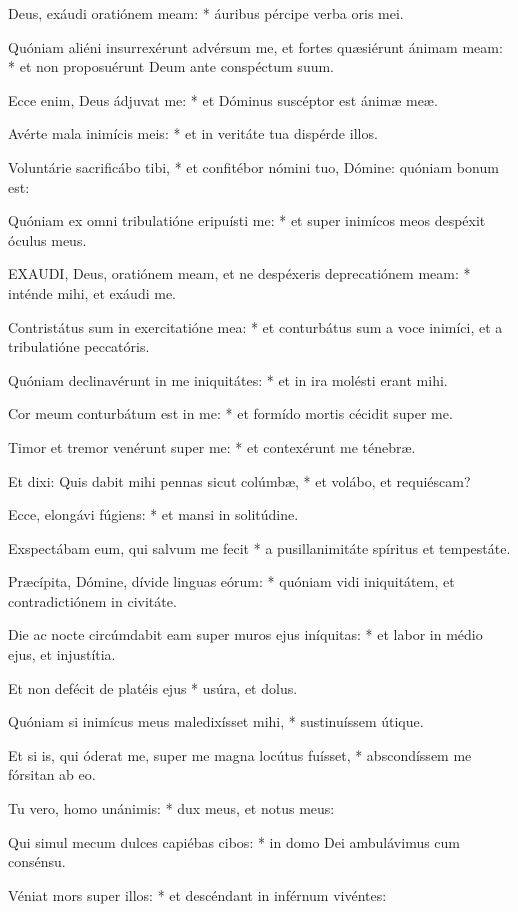 Deus, exáudi oratiónem meam: * áuribus pércipe verba oris mei.

Quóniam aliéni insurrexérunt advérsum me, et fortes quæsiérunt ánimam meam: * et non proposuérunt Deum ante conspéctum suum.

Ecce enim, Deus ádjuvat me: * et Dóminus suscéptor est ánimæ meæ.

Avérte mala inimícis meis: * et in veritáte tua dispérde illos.

Voluntárie sacrificábo tibi, * et confitébor nómini tuo, Dómine: quóniam bonum est:

Quóniam ex omni tribulatióne eripuísti me: * et super inimícos meos despéxit óculus meus.


\lettrine[lines=2]{E}{XAUDI}, Deus, oratiónem meam, et ne despéxeris deprecatiónem meam: * inténde mihi, et exáudi me.

Contristátus sum in exercitatióne mea: * et conturbátus sum a voce inimíci, et a tribulatióne peccatóris.

Quóniam declinavérunt in me iniquitátes: * et in ira molésti erant mihi.

Cor meum conturbátum est in me: * et formído mortis cécidit super me.

Timor et tremor venérunt super me: * et contexérunt me ténebræ.

Et dixi: Quis dabit mihi pennas sicut colúmbæ, * et volábo, et requiéscam?

Ecce, elongávi fúgiens: * et mansi in solitúdine.

Exspectábam eum, qui salvum me fecit * a pusillanimitáte spíritus et tempestáte.

Præcípita, Dómine, dívide linguas eórum: * quóniam vidi iniquitátem, et contradictiónem in civitáte.

Die ac nocte circúmdabit eam super muros ejus iníquitas: * et labor in médio ejus, et injustítia.

Et non defécit de platéis ejus * usúra, et dolus.

Quóniam si inimícus meus maledixísset mihi, * sustinuíssem útique.

Et si is, qui óderat me, super me magna locútus fuísset, * abscondíssem me fórsitan ab eo.

Tu vero, homo unánimis: * dux meus, et notus meus:

Qui simul mecum dulces capiébas cibos: * in domo Dei ambulávimus cum consénsu.

Véniat mors super illos: * et descéndant in inférnum vivéntes:

